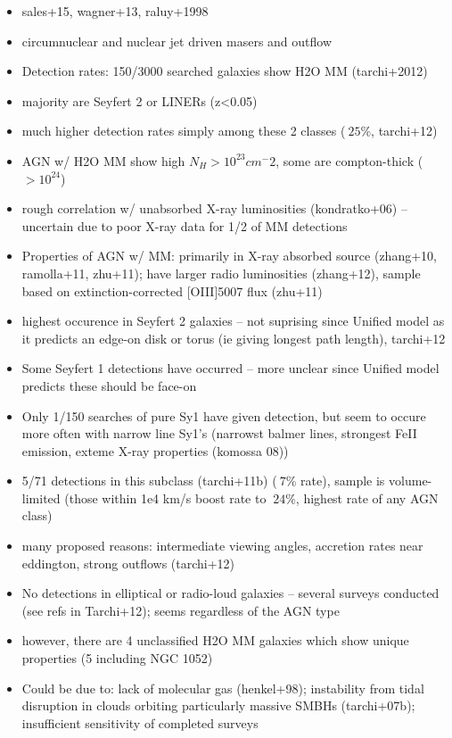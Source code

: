 \begin{itemize}
\item sales+15, wagner+13, raluy+1998
\item circumnuclear and nuclear jet driven masers and outflow
\item Detection rates: 150/3000 searched galaxies show H2O MM (tarchi+2012)
\item majority are Seyfert 2 or LINERs (z<0.05)
\item much higher detection rates simply among these 2 classes ($~25$\%, tarchi+12)
\item AGN w/ H2O MM show high $N_H > 10^23 cm^-2$, some are compton-thick ($>10^24$)
\item rough correlation w/ unabsorbed X-ray luminosities (kondratko+06) -- uncertain due to poor X-ray data for 1/2 of MM detections
\item Properties of AGN w/ MM: primarily in X-ray absorbed source (zhang+10, ramolla+11, zhu+11); have larger radio luminosities (zhang+12), sample based on extinction-corrected [OIII]5007 flux (zhu+11)
\item highest occurence in Seyfert 2 galaxies -- not suprising since Unified model as it predicts an edge-on disk or torus (ie giving longest path length), tarchi+12
\item Some Seyfert 1 detections have occurred -- more unclear since Unified model predicts these should be face-on
\item Only 1/150 searches of pure Sy1 have given detection, but seem to occure more often with narrow line Sy1's (narrowst balmer lines, strongest FeII emission, exteme X-ray properties (komossa 08))
\item 5/71 detections in this subclass (tarchi+11b) ($~7$\% rate), sample is volume-limited (those within 1e4 km/s boost rate to $~24$\%, highest rate of any AGN class)
\item many proposed reasons: intermediate viewing angles, accretion rates near eddington, strong outflows (tarchi+12)
\item No detections in elliptical or radio-loud galaxies -- several surveys conducted (see refs in Tarchi+12); seems regardless of the AGN type
\item however, there are 4 unclassified H2O MM galaxies which show unique properties (5 including NGC 1052)
\item Could be due to: lack of molecular gas (henkel+98); instability from tidal disruption in clouds orbiting particularly massive SMBHs (tarchi+07b); insufficient sensitivity of completed surveys
\end{itemize}

